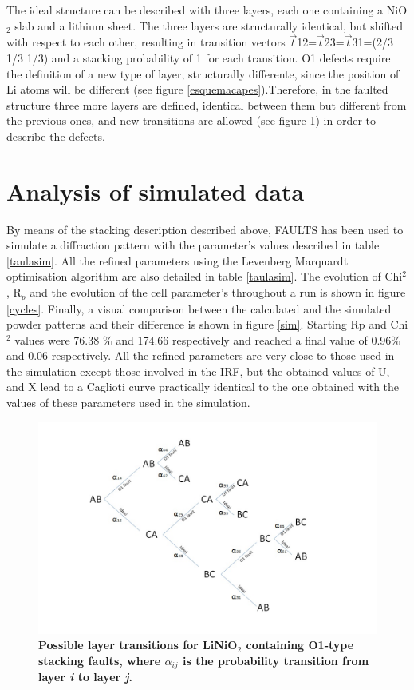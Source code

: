 The ideal structure can be described with three layers, each one containing a NiO$_{2}$ slab and a lithium sheet. The three layers are structurally identical, but shifted with respect to each other, resulting in transition vectors $\vec{t}$12=$\vec{t}$23=$\vec{t}$31=(2/3 1/3 1/3) and a stacking probability of 1 for each transition. O1 defects require the definition of a new type of layer, structurally differente, since the position of Li atoms will be different (see figure \ref{esquemacapes}).Therefore, in the faulted structure three more layers are defined, identical between them but different from the previous ones, and new transitions are allowed (see figure \ref{capes}) in order to describe the defects.   
 
 
\section{Analysis of simulated data}

By  means of the  stacking description described above, FAULTS has been used to simulate a diffraction pattern with the parameter's values described in table \ref{taulasim}.
All the refined parameters using the Levenberg Marquardt optimisation algorithm are also detailed in table \ref{taulasim}. The evolution of Chi$^{2}$, R$_{p}$ and the evolution of the cell parameter's throughout a run is shown in figure \ref{cycles}. Finally, a visual comparison between the calculated and the simulated powder patterns and their difference is shown in figure \ref{sim}.
Starting Rp and Chi$^{2}$ values were 76.38 $\%$  and 174.66 respectively and reached a final value of 0.96$\%$ and 0.06 respectively. 
All the refined parameters are very close to those used in the simulation except those involved in the IRF, but the obtained values of U, and X lead to a Caglioti curve practically 
identical to the one obtained with the values of these parameters used in the simulation.

\begin{figure}[!htbp]
\begin{center}
\includegraphics [width=4 in]{transitions.jpg}
\caption{\bf Possible layer transitions for LiNiO$_2$ containing O1-type stacking faults, where $\alpha_{ij}$ is the probability transition from layer \emph{i} to layer \emph{j}.}
\label{capes}
\end{center}
\end{figure}
 

